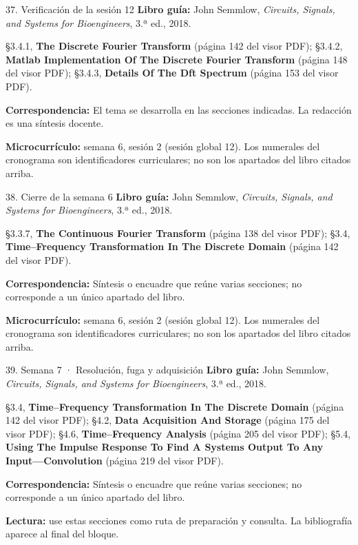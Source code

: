 \documentclass[
  10pt,
  ignorenonframetext,
  aspectratio=169,
  spanish,
]{beamer}
\begin{document}
\begin{frame}{37. Verificación de la sesión 12}
\label{verificaciuxf3n-de-la-sesiuxf3n-12}
\textbf{Libro guía:} John Semmlow, \emph{Circuits, Signals, and Systems
for Bioengineers}, 3.ª ed., 2018.

§3.4.1, \textbf{The Discrete Fourier Transform} (página 142 del visor
PDF); §3.4.2, \textbf{Matlab Implementation Of The Discrete Fourier
Transform} (página 148 del visor PDF); §3.4.3, \textbf{Details Of The
Dft Spectrum} (página 153 del visor PDF).

\textbf{Correspondencia:} El tema se desarrolla en las secciones
indicadas. La redacción es una síntesis docente.

\textbf{Microcurrículo:} semana 6, sesión 2 (sesión global 12). Los
numerales del cronograma son identificadores curriculares; no son los
apartados del libro citados arriba.
\end{frame}

\begin{frame}{38. Cierre de la semana 6}
\label{cierre-de-la-semana-6}
\textbf{Libro guía:} John Semmlow, \emph{Circuits, Signals, and Systems
for Bioengineers}, 3.ª ed., 2018.

§3.3.7, \textbf{The Continuous Fourier Transform} (página 138 del visor
PDF); §3.4, \textbf{Time--Frequency Transformation In The Discrete
Domain} (página 142 del visor PDF).

\textbf{Correspondencia:} Síntesis o encuadre que reúne varias
secciones; no corresponde a un único apartado del libro.

\textbf{Microcurrículo:} semana 6, sesión 2 (sesión global 12). Los
numerales del cronograma son identificadores curriculares; no son los
apartados del libro citados arriba.
\end{frame}

\begin{frame}{39. Semana 7 · Resolución, fuga y adquisición}
\label{semana-7-resoluciuxf3n-fuga-y-adquisiciuxf3n}
\textbf{Libro guía:} John Semmlow, \emph{Circuits, Signals, and Systems
for Bioengineers}, 3.ª ed., 2018.

§3.4, \textbf{Time--Frequency Transformation In The Discrete Domain}
(página 142 del visor PDF); §4.2, \textbf{Data Acquisition And Storage}
(página 175 del visor PDF); §4.6, \textbf{Time--Frequency Analysis}
(página 205 del visor PDF); §5.4, \textbf{Using The Impulse Response To
Find A Systems Output To Any Input---Convolution} (página 219 del visor
PDF).

\textbf{Correspondencia:} Síntesis o encuadre que reúne varias
secciones; no corresponde a un único apartado del libro.

\textbf{Lectura:} use estas secciones como ruta de preparación y
consulta. La bibliografía aparece al final del bloque.
\end{frame}
\end{document}
